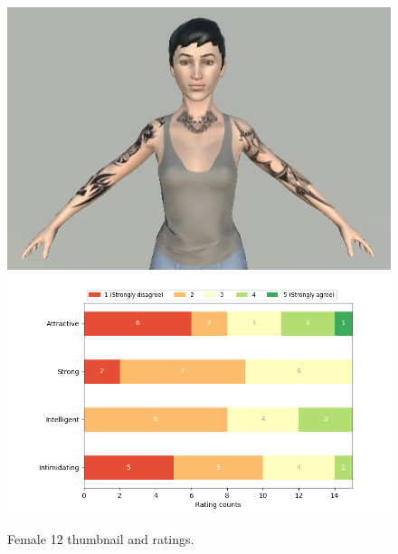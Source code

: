 \begin{figure}[H]
  \includegraphics[width=\linewidth]{Images/Females/12.JPG}
\endminipage\hfill
{}
  \includegraphics[width=\linewidth]{Survey/FRatings/avatar_f12.png}
\endminipage\hfill
\caption{Female 12 thumbnail and ratings.}
\end{figure}

